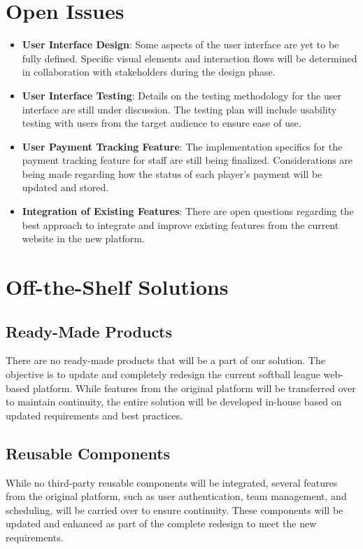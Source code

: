 \documentclass[12pt]{article}
\begin{document}
\section{Open Issues}
\begin{itemize}
    \item \textbf{User Interface Design}: Some aspects of the user interface are yet to be fully defined. Specific visual elements and interaction flows will be determined in collaboration with stakeholders during the design phase.
    \item \textbf{User Interface Testing}: Details on the testing methodology for the user interface are still under discussion. The testing plan will include usability testing with users from the target audience to ensure ease of use.
    \item \textbf{User Payment Tracking Feature}: The implementation specifics for the payment tracking feature for staff are still being finalized. Considerations are being made regarding how the status of each player's payment will be updated and stored.
    \item \textbf{Integration of Existing Features}: There are open questions regarding the best approach to integrate and improve existing features from the current website in the new platform.
\end{itemize}

\section{Off-the-Shelf Solutions}
\subsection{Ready-Made Products}
There are no ready-made products that will be a part of our solution. The objective is to update and completely redesign the current softball league web-based platform. While features from the original platform will be transferred over to maintain continuity, the entire solution will be developed in-house based on updated requirements and best practices.

\subsection{Reusable Components}
While no third-party reusable components will be integrated, several features from the original platform, such as user authentication, team management, and scheduling, will be carried over to ensure continuity. These components will be updated and enhanced as part of the complete redesign to meet the new requirements.
\end{document}
